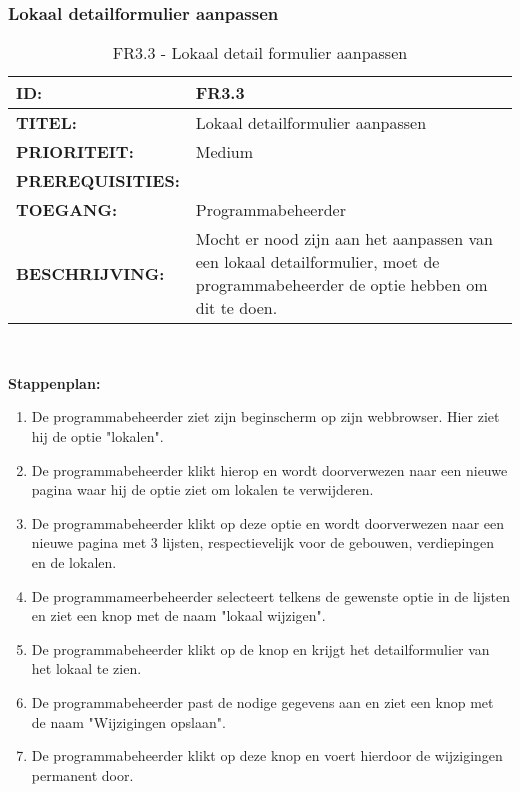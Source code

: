 \subsubsection{Lokaal detailformulier aanpassen} 
\noindent\begin{table}[H]
            \begin{tabular}{l | p{10cm}}
                \textbf{ID:} & FR3.3 \\ \hline
                \textbf{TITEL:} & Lokaal detailformulier aanpassen\\ \hline
                \textbf{PRIORITEIT:} &  Medium \\ \hline
                \textbf{PREREQUISITIES:} & \\ \hline
                \textbf{TOEGANG:} & Programmabeheerder \\ \hline
                \textbf{BESCHRIJVING:} & Mocht er nood zijn aan het aanpassen van een lokaal detailformulier, moet de programmabeheerder de optie hebben om dit te doen.\\ 
            \end{tabular}\\
            \caption{FR3.3 - Lokaal detail formulier aanpassen}
            \label{tab:FR3.3 - Lokaal detailformulier aanpassen}
        \end{table}
        
\textbf{Stappenplan:}
\begin{enumerate}
\item De programmabeheerder ziet zijn beginscherm op zijn webbrowser. Hier ziet hij de optie "lokalen".
\item De programmabeheerder klikt hierop en wordt doorverwezen naar een nieuwe pagina waar hij de optie ziet om lokalen te verwijderen.
\item De programmabeheerder klikt op deze optie en wordt doorverwezen naar een nieuwe pagina met 3 lijsten, respectievelijk voor de gebouwen, verdiepingen en de lokalen.
\item De programmameerbeheerder selecteert telkens de gewenste optie in de lijsten en ziet een knop met de naam "lokaal wijzigen".
\item De programmabeheerder klikt op de knop en krijgt het detailformulier van het lokaal te zien.
\item De programmabeheerder past de nodige gegevens aan en ziet een knop met de naam "Wijzigingen opslaan".
\item De programmabeheerder klikt op deze knop en voert hierdoor de wijzigingen permanent door.
\end{enumerate}
\clearpage